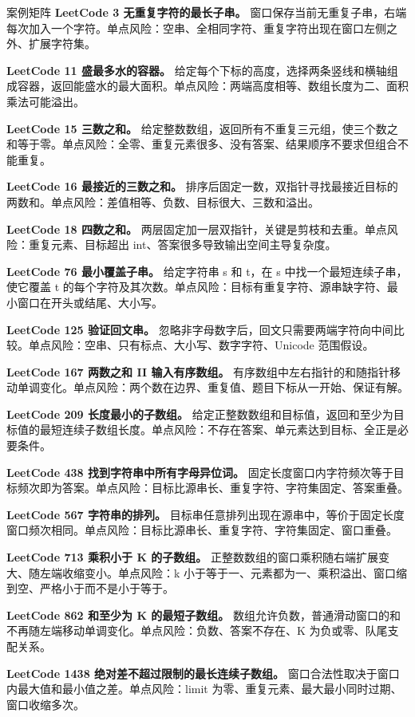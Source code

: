 \begin{principlebox}{案例矩阵}
\textbf{LeetCode 3 无重复字符的最长子串。}
窗口保存当前无重复子串，右端每次加入一个字符。单点风险：空串、全相同字符、重复字符出现在窗口左侧之外、扩展字符集。

\textbf{LeetCode 11 盛最多水的容器。}
给定每个下标的高度，选择两条竖线和横轴组成容器，返回能盛水的最大面积。单点风险：两端高度相等、数组长度为二、面积乘法可能溢出。

\textbf{LeetCode 15 三数之和。}
给定整数数组，返回所有不重复三元组，使三个数之和等于零。单点风险：全零、重复元素很多、没有答案、结果顺序不要求但组合不能重复。

\textbf{LeetCode 16 最接近的三数之和。}
排序后固定一数，双指针寻找最接近目标的两数和。单点风险：差值相等、负数、目标很大、三数和溢出。

\textbf{LeetCode 18 四数之和。}
两层固定加一层双指针，关键是剪枝和去重。单点风险：重复元素、目标超出 int、答案很多导致输出空间主导复杂度。

\textbf{LeetCode 76 最小覆盖子串。}
给定字符串 s 和 t，在 s 中找一个最短连续子串，使它覆盖 t 的每个字符及其次数。单点风险：目标有重复字符、源串缺字符、最小窗口在开头或结尾、大小写。

\textbf{LeetCode 125 验证回文串。}
忽略非字母数字后，回文只需要两端字符向中间比较。单点风险：空串、只有标点、大小写、数字字符、Unicode 范围假设。

\textbf{LeetCode 167 两数之和 II 输入有序数组。}
有序数组中左右指针的和随指针移动单调变化。单点风险：两个数在边界、重复值、题目下标从一开始、保证有解。

\textbf{LeetCode 209 长度最小的子数组。}
给定正整数数组和目标值，返回和至少为目标值的最短连续子数组长度。单点风险：不存在答案、单元素达到目标、全正是必要条件。

\textbf{LeetCode 438 找到字符串中所有字母异位词。}
固定长度窗口内字符频次等于目标频次即为答案。单点风险：目标比源串长、重复字符、字符集固定、答案重叠。

\textbf{LeetCode 567 字符串的排列。}
目标串任意排列出现在源串中，等价于固定长度窗口频次相同。单点风险：目标比源串长、重复字符、字符集固定、窗口重叠。

\textbf{LeetCode 713 乘积小于 K 的子数组。}
正整数数组的窗口乘积随右端扩展变大、随左端收缩变小。单点风险：k 小于等于一、元素都为一、乘积溢出、窗口缩到空、严格小于而不是小于等于。

\textbf{LeetCode 862 和至少为 K 的最短子数组。}
数组允许负数，普通滑动窗口的和不再随左端移动单调变化。单点风险：负数、答案不存在、K 为负或零、队尾支配关系。

\textbf{LeetCode 1438 绝对差不超过限制的最长连续子数组。}
窗口合法性取决于窗口内最大值和最小值之差。单点风险：limit 为零、重复元素、最大最小同时过期、窗口收缩多次。

\end{principlebox}

